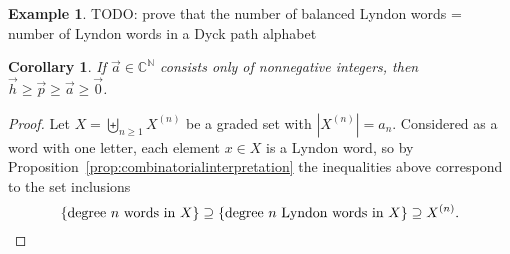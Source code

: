 \documentclass[11pt]{amsart}
\newtheorem{corollary}[theorem]{Corollary}
\theoremstyle{definition}
\newtheorem{example}[theorem]{Example}
\numberwithin{equation}{section}
\def\NN{{\mathbb N}}
\def\CC{{\mathbb C}}
\begin{document}
\begin{example} TODO: prove that
the number of balanced
Lyndon words = number of Lyndon words in a Dyck path alphabet
\end{example}

\begin{corollary}
If $\vec{a} \in \CC^{\NN}$ consists only of nonnegative integers, then $\vec{h} \geq \vec{p} \geq \vec{a} \geq \vec{0}$.
\end{corollary}
\begin{proof}
Let $X = \biguplus_{n \ge 1} X^{(n)}$ be a graded set with $|X^{(n)}| = a_{n}$.  
Considered as a word with one letter, each element $x \in X$ is a Lyndon word, so by Proposition~\ref{prop:combinatorialinterpretation} the inequalities above correspond to the set inclusions
\[
\{\text{degree $n$ words in $X$}\} 
\supseteq \{\text{degree $n$ Lyndon words in $X$}\} 
\supseteq X^{(n)}. \qedhere
\]
\end{proof}
\end{document}
